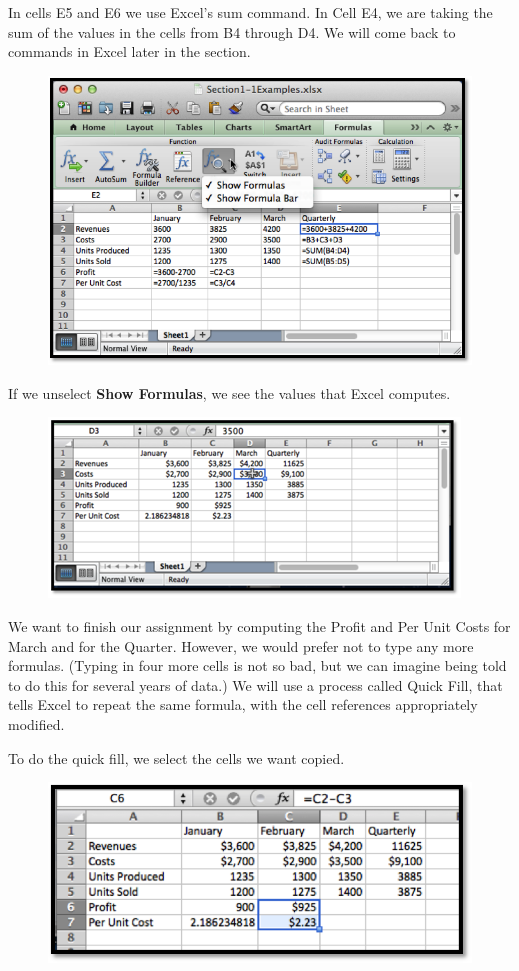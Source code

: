 \documentclass[10pt,]{book}
\newcommand{\terminology}[1]{\textbf{#1}}
\theoremstyle{plain}
\theoremstyle{definition}
\theoremstyle{definition}
\begin{document}
In cells E5 and E6 we use Excel's sum command.  In Cell E4, we are taking the sum of the values in the cells from B4 through D4.  We will come back to commands in Excel later in the section.%
\leavevmode%
\begin{figure}
\centering
\includegraphics[width=0.8\linewidth]{images/sec1-3-2ShowFormulas.png}
\end{figure}
\par
If we unselect \terminology{Show Formulas}, we see the values that Excel computes.%
\leavevmode%
\begin{figure}
\centering
\includegraphics[width=0.8\linewidth]{images/sec1-3-3UnshowFormulas.png}
\end{figure}
\par
We want to finish our assignment by computing the Profit and Per Unit Costs for March and for the Quarter.  However, we would prefer not to type any more formulas.  (Typing in four more cells is not so bad, but we can imagine being told to do this for several years of data.)  We will use a process called Quick Fill, that tells Excel to repeat the same formula, with the cell references appropriately modified.%
\par

To do the quick fill, we select the cells we want copied.
%
\leavevmode%
\begin{figure}
\centering
\includegraphics[width=0.8\linewidth]{images/sec1-3-4.png}
\end{figure}
\par
\end{document}
